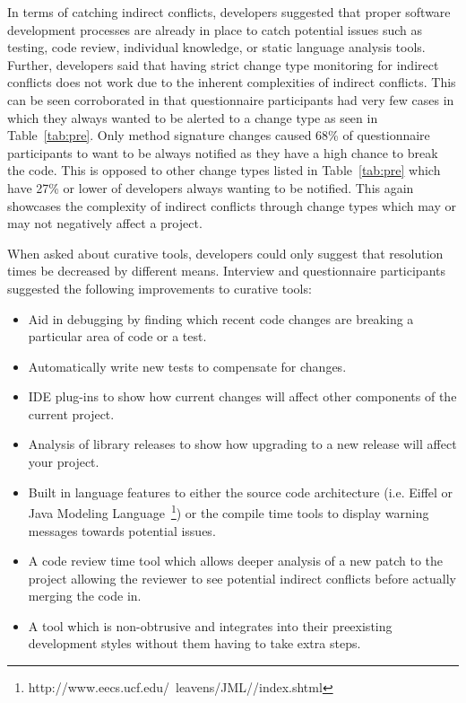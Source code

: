 \documentclass[conference]{IEEEtran}
\begin{document}
In terms of catching indirect conflicts, developers suggested that proper software development processes
are already in place to catch potential issues such as testing, code review,
individual knowledge, or static language analysis tools. Further, developers said that having strict change type monitoring
for indirect conflicts does not work due to the inherent complexities of indirect conflicts.
This can be seen corroborated in that questionnaire participants had very few cases in which they always wanted to be
alerted to a change type as seen in Table~\ref{tab:pre}. Only method signature changes caused 68\% of questionnaire participants
to want to be always notified as they have a high chance to break the code. This is opposed to other change types listed in
Table~\ref{tab:pre} which have 27\% or lower of developers always wanting to be notified. This again showcases the
complexity of indirect conflicts through change types which may or may not negatively affect a project.

When asked about curative tools, developers could only suggest that resolution times be decreased by different means.
Interview and questionnaire participants suggested the following improvements to curative tools:

\begin{itemize}
	\item Aid in debugging by finding which recent code changes are breaking a particular area of code or a test.
	\item Automatically write new tests to compensate for changes.
	\item IDE plug-ins to show how current changes will affect other components of the current project.
	\item Analysis of library releases to show how upgrading to a new release will affect your project.
	\item Built in language features to either the source code architecture (i.e. Eiffel or
				Java Modeling Language~\footnote{http://www.eecs.ucf.edu/~leavens/JML//index.shtml}) or the compile
				time tools to display warning messages towards potential issues.
	\item A code review time tool which allows deeper analysis of a new patch to the project allowing the reviewer to see potential
				indirect conflicts before actually merging the code in.
	\item A tool which is non-obtrusive and integrates into their preexisting development styles without them having to take extra steps.
\end{itemize}
\end{document}
